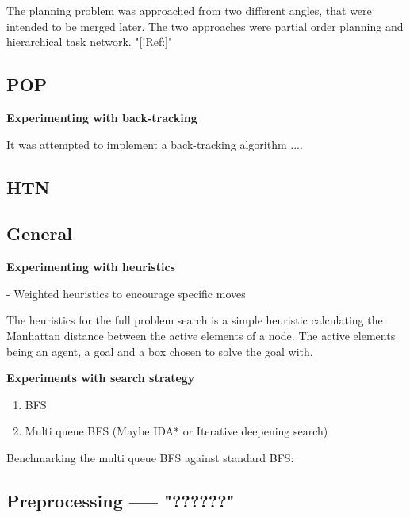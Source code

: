 \documentclass[Main]{subfiles}
\begin{document}
The planning problem was approached from two different angles, that were intended to be merged later. The two approaches were partial order planning and hierarchical task network. "[!Ref:]" 


\subsection{POP}

\textbf{Experimenting with back-tracking}

It was attempted to implement a back-tracking algorithm ....






\subsection{HTN}





\subsection{General} 


\textbf{Experimenting with heuristics}

- Weighted heuristics to encourage specific moves

The heuristics for the full problem search is a simple heuristic calculating the Manhattan distance between the active elements of a node. The active elements being an agent, a goal and a box chosen to solve the goal with. 




\textbf{Experiments with search strategy}

\begin{enumerate}
    \item BFS 
    \item Multi queue BFS (Maybe IDA* or Iterative deepening search)
\end{enumerate}



Benchmarking the multi queue BFS against standard BFS:





\subsection{Preprocessing ----- "??????" }
\end{document}

